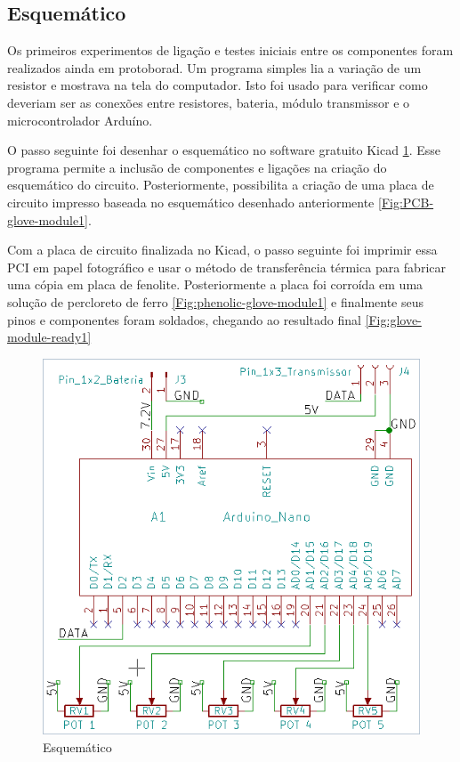 \documentclass[
	12pt,				%
	openright,			%
	oneside,			%
	a4paper,			%
	english,			%
	brazil				%
	]{abntex2}
\begin{document}
			\subsection{Esquemático}

			Os primeiros experimentos de ligação e testes iniciais entre os componentes foram realizados ainda em protoborad. Um programa simples lia a variação de um resistor e mostrava na tela do computador. Isto foi usado para verificar como deveriam ser as conexões entre resistores, bateria, módulo transmissor e o microcontrolador Arduíno.

			O passo seguinte foi desenhar o esquemático no software gratuito Kicad \ref{Fig:schematic-glove-module1}. Esse programa permite a inclusão de componentes e ligações na criação do esquemático do circuito. Posteriormente, possibilita a criação de uma placa de circuito impresso baseada no esquemático desenhado anteriormente  \ref{Fig:PCB-glove-module1}.

			Com a placa de circuito finalizada no Kicad, o passo seguinte foi imprimir essa PCI em papel fotográfico e usar o método de transferência térmica para fabricar uma cópia em placa de fenolite. Posteriormente a placa foi corroída em uma solução de percloreto de ferro \ref{Fig:phenolic-glove-module1} e finalmente seus pinos e componentes foram soldados, chegando ao resultado final \ref{Fig:glove-module-ready1}



		\begin{figure}[h!]
			\centering
  		\includegraphics[scale=0.5]{./figures/schematic-glove-module1.png}
			\caption{Esquemático}
  		\label{Fig:schematic-glove-module1}
		\end{figure}
\end{document}
